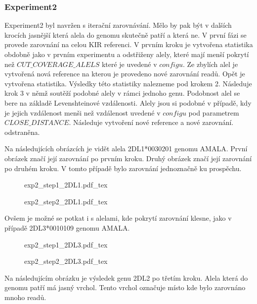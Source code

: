 \documentclass[czech,DP]{thesiskiv}
\numberwithin{equation}{section}
\begin{document}
\subsubsection{Experiment2}
Experiment2 byl navržen s iterační zarovnávání. Mělo by pak být v dalších krocích jasnější která alela do genomu skutečně patří a která ne. V první fázi se provede zarovnání na celou KIR referenci. V prvním kroku je vytvořena statistika obdobně jako v prvním experimentu a odstřiženy alely, které mají menší pokrytí než $CUT\_COVERAGE\_ALELS$ které je uvedené v $configu$. Ze zbylích alel je vytvořená nová reference na kterou je provedeno nové zarovnání readů. Opět je vytvořena statistika. Výsledky této statistiky nalezneme pod krokem 2. Následuje krok 3 v němž soutěží podobné alely v rámci jednoho genu. Podobnost alel se bere na základě Levenshteinové vzdálenosti. Alely jsou si podobné v případě, kdy je jejich vzdálenost menši než vzdálenost uvedené v $configu$ pod parametrem $CLOSE\_DISTANCE$. Následuje vytvoření nové reference a nové zarovnání.  odstraněna.

\noindent
Na následujících obrázcích je vidět alela 2DL1*0030201 genomu AMALA. První obrázek značí její zarovnání po prvním kroku. Druhý obrázek značí její zarovnání po druhém kroku. V tomto případě bylo zarovnání jednoznačně ku prospěchu.

\begin{figure}[H]
	\centering
    \def\svgwidth{\columnwidth}
    {exp2_step1_2DL1.pdf_tex} 
\end{figure}

\begin{figure}[H]
	\centering
    \def\svgwidth{\columnwidth}
    {exp2_step2_2DL1.pdf_tex} 
\end{figure}

\noindent
Ovšem je možné se potkat i s alelami, kde pokrytí zarovnání klesne, jako v případě 2DL3*0010109 genomu AMALA.

\begin{figure}[H]
	\centering
    \def\svgwidth{\columnwidth}
    {exp2_step1_2DL3.pdf_tex} 
\end{figure}

\begin{figure}[H]
	\centering
    \def\svgwidth{\columnwidth}
    {exp2_step2_2DL3.pdf_tex} 
\end{figure}

\noindent
Na následujícím obrázku je výsledek genu 2DL2 po třetím kroku. Alela která do genomu patří má jasný vrchol. Tento vrchol označuje místo kde bylo zarovnáno mnoho readů. 
\end{document}
